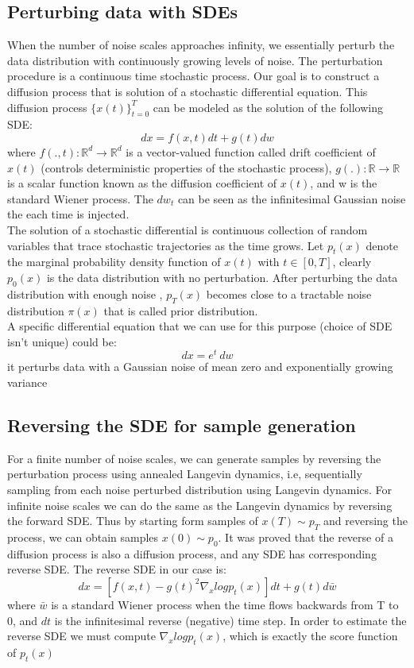 \documentclass{article}
\begin{document}
	\subsection{Perturbing data with SDEs}
When the number of noise scales approaches infinity, we essentially perturb the data distribution with continuously growing levels of noise. The perturbation procedure is a continuous time stochastic process. Our goal is to construct a diffusion process that is solution of a stochastic differential equation. This diffusion process $\{ x(t) \}_{t=0}^{T}$ can be modeled as the solution of the following SDE:
	\begin{equation}
	 dx= f(x,t)dt + g(t)dw
	\end{equation}
	where $f(.,t): \mathbb{R}^{d} \rightarrow \mathbb{R}^{d}$ is a vector-valued function called drift coefficient of $x(t)$ (controls deterministic properties of the stochastic process), $g(.): \mathbb{R} \rightarrow \mathbb{R}$ is a scalar function known as the diffusion coefficient of $x(t)$, and w is the standard Wiener process. The $dw_{t}$ can be seen as the infinitesimal Gaussian noise the each time is injected.\\
	The solution of a stochastic differential is continuous collection of random variables that trace stochastic trajectories as the time grows. Let $p_{t}(x)$ denote the marginal probability density function of $x(t)$ with $t \in [0,T] $, clearly $p_{0}(x)$ is the data distribution with no perturbation. After perturbing the data distribution with enough noise , $p_{T}(x)$ becomes close to a tractable noise distribution $\pi (x)$ that is called prior distribution. \\
	\newline
	A specific differential equation that we can use for this purpose (choice of SDE isn't unique) could be:
	\begin{equation}
	dx=e^t\ dw
	\end{equation}
	it perturbs data with a Gaussian noise of mean zero and exponentially growing variance
	\subsection{Reversing the SDE for sample generation}
For a finite number of noise scales, we can generate samples by reversing the perturbation process using annealed Langevin dynamics, i.e, sequentially sampling from each noise perturbed distribution using Langevin dynamics. For infinite noise scales we can do the same as the Langevin dynamics by reversing the forward SDE. Thus by starting form samples of $x(T) \sim p_{T}$ and reversing the process, we can obtain samples $x(0) \sim p_{0}$. It was proved that the reverse of a diffusion process is also a diffusion process, and any SDE has corresponding reverse SDE. The reverse SDE in our case is:
	\begin{equation}
	dx = [f(x,t)-g(t)^2 \nabla_{x}logp_{t}(x)]dt+g(t)d \bar{w}
	\end{equation}
	where $\bar{w}$ is a standard Wiener process when the time flows backwards from T to 0, and $dt$ is the infinitesimal reverse (negative) time step. In order to estimate the reverse SDE we must compute $\nabla_{x}logp_{t}(x)$, which is exactly the score function of $p_t(x)$
\end{document}
